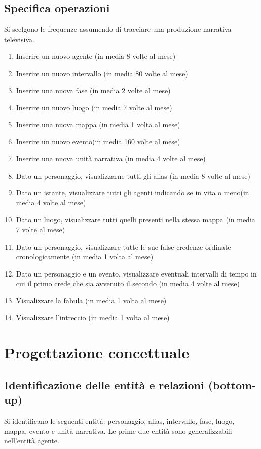 \documentclass{article}
\begin{document}
\subsection{Specifica operazioni}
Si scelgono le frequenze assumendo di tracciare una produzione narrativa
televisiva.
\begin{enumerate}
	\item Inserire un nuovo agente (in media 8 volte al mese)
	\item Inserire un nuovo intervallo (in media 80 volte al mese)
	\item Inserire una nuova fase (in media 2 volte al mese)
	\item Inserire un nuovo luogo (in media 7 volte al mese)
	\item Inserire una nuova mappa (in media 1 volta al mese)
	\item Inserire un nuovo evento(in media 160 volte al mese)
	\item Inserire una nuova unità narrativa (in media 4 volte al mese)
	\item Dato un personaggio, visualizzarne tutti gli alias (in media 8 volte al
	      mese)
	\item Dato un istante, visualizzare tutti gli agenti indicando se in vita o
	      meno(in media 4 volte al mese)
	\item Dato un luogo, visualizzare tutti quelli presenti nella stessa mappa (in
	      media 7 volte al mese)
	\item Dato un personaggio, visualizzare tutte le sue false credenze ordinate
	      cronologicamente (in media 1 volta al mese)
	\item Dato un personaggio e un evento, visualizzare eventuali intervalli di
	      tempo in cui il primo crede che sia avvenuto il secondo (in media 4
	      volte al mese)
	\item Visualizzare la fabula (in media 1 volta al mese)
	\item Visualizzare l'intreccio (in media 1 volta al mese)
\end{enumerate}


\section{Progettazione concettuale}

\subsection{Identificazione delle entità e relazioni (bottom-up)}
Si identificano le seguenti entità: personaggio, alias, intervallo,
fase, luogo, mappa, evento e unità narrativa.
Le prime due entità sono generalizzabili nell'entità agente.
\end{document}
